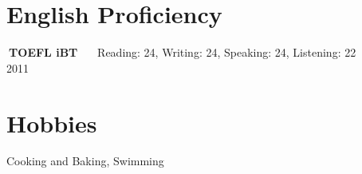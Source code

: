 \documentclass[line,margin]{res}
\begin{document}
\begin{resume}
\section{English Proficiency}


 \textbullet$~${\bf TOEFL iBT}  \hfill $~~~~~$ Reading: 24, Writing: 24, Speaking: 24, Listening: 22\\ 2011 

\section{Hobbies}             
  Cooking and Baking, Swimming 
 
\end{resume}
\end{document}
